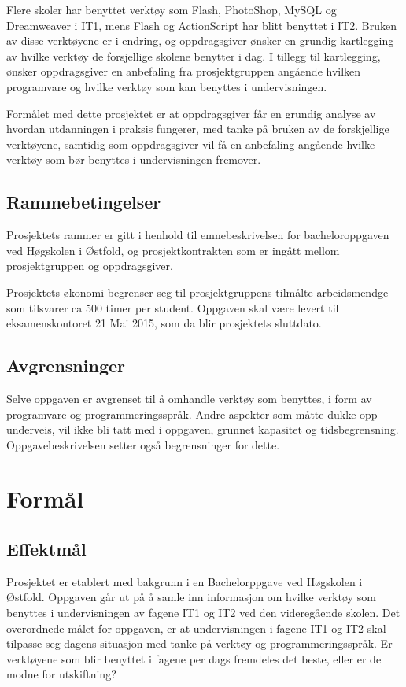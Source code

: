 \documentclass[norsk,a4paper,12pt]{article}
\begin{document}
Flere skoler har benyttet verktøy som Flash, PhotoShop, MySQL og Dreamweaver i IT1, mens Flash og ActionScript har blitt benyttet i IT2. 
Bruken av disse verktøyene er i endring, og oppdragsgiver ønsker en grundig kartlegging av hvilke verktøy de forsjellige skolene benytter i dag. I tillegg til kartlegging,  ønsker oppdragsgiver en anbefaling fra prosjektgruppen angående hvilken programvare og hvilke verktøy som kan benyttes i undervisningen. 

Formålet med dette prosjektet er at oppdragsgiver får en grundig analyse av hvordan  utdanningen i praksis fungerer, med tanke på bruken av de forskjellige verktøyene, samtidig som oppdragsgiver vil få en anbefaling angående hvilke verktøy som bør benyttes i undervisningen fremover.

\subsection{Rammebetingelser}

Prosjektets rammer er gitt i henhold til emnebeskrivelsen for bacheloroppgaven ved Høgskolen i Østfold, og prosjektkontrakten som er ingått mellom prosjektgruppen og oppdragsgiver. 

Prosjektets økonomi begrenser seg til prosjektgruppens tilmålte arbeidsmendge som tilsvarer ca 500 timer per student. Oppgaven skal være levert til eksamenskontoret 21 Mai 2015, som da blir prosjektets sluttdato. 

\subsection{Avgrensninger}

Selve oppgaven er avgrenset til å omhandle verktøy som benyttes, i form av programvare og programmeringsspråk. Andre aspekter som måtte dukke opp underveis, vil ikke bli tatt med i oppgaven, grunnet kapasitet og tidsbegrensning. Oppgavebeskrivelsen setter også begrensninger for dette.

\section{Formål}

\subsection{Effektmål}

Prosjektet er etablert med bakgrunn i en Bachelorppgave ved Høgskolen i Østfold. Oppgaven går ut på å samle inn informasjon om hvilke verktøy som benyttes i undervisningen av fagene IT1 og IT2 ved den videregående skolen. Det overordnede målet for oppgaven, er at undervisningen i fagene IT1 og IT2 skal tilpasse seg dagens situasjon med tanke på verktøy og programmeringsspråk. Er verktøyene som blir benyttet i fagene per dags fremdeles det beste, eller er de modne for utskiftning? 
\end{document}
